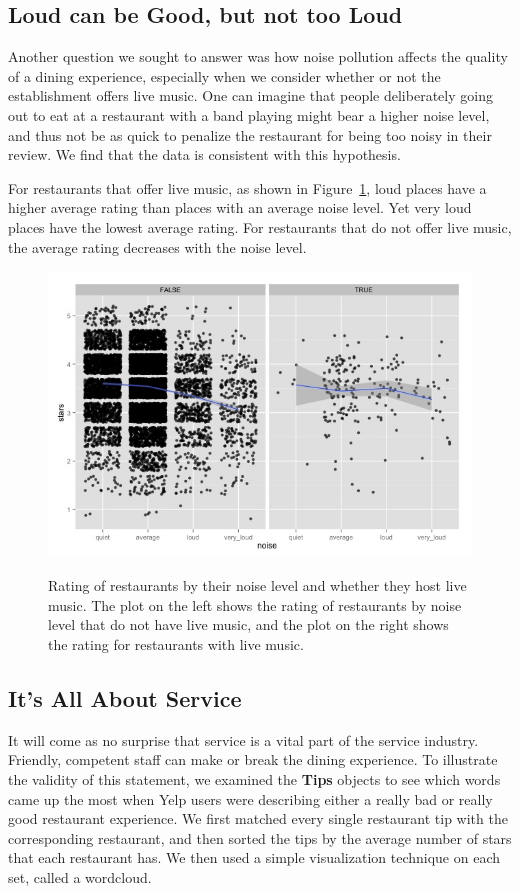 \documentclass[11pt]{article}
\begin{document}
\subsection{Loud can be Good, but not too Loud}

Another question we sought to answer was how noise pollution affects the quality of a dining experience, especially when we consider whether or not the establishment offers live music. One can imagine that people deliberately going out to eat at a restaurant with a band playing might bear a higher noise level, and thus not be as quick to penalize the restaurant for being too noisy in their review. We find that the data is consistent with this hypothesis.

For restaurants that offer live music, as shown in Figure~\ref{fig:food_noise}, loud places have a higher average rating than places with an average noise level. Yet very loud places have the lowest average rating. For restaurants that do not offer live music, the average rating decreases with the noise level.

\begin{figure}[p]
\caption{Rating of restaurants by their noise level and whether they host live music. The plot on the left shows the rating of restaurants by noise level that do not have live music, and the plot on the right shows the rating for restaurants with live music.}
\centering
\includegraphics[width=0.7\linewidth]{Figures/food_noise.jpeg}
\label{fig:food_noise}
\end{figure}


\subsection{It's All About Service}

It will come as no surprise that service is a vital part of the service industry. Friendly, competent staff can make or break the dining experience. To illustrate the validity of this statement, we examined the \textbf{Tips} objects to see which words came up the most when Yelp users were describing either a really bad or really good restaurant experience. We first matched every single restaurant tip with the corresponding restaurant, and then sorted the tips by the average number of stars that each restaurant has. We then used a simple visualization technique on each set, called a wordcloud. 
\end{document}
